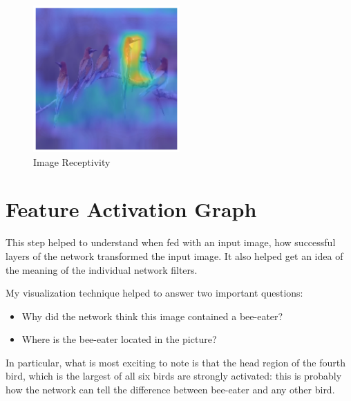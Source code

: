 \begin{figure}[htbp]
\centering
\includegraphics[width=0.50\textwidth]{images/heatmap-class-activations.png}
\caption{Image Receptivity}
\label{fig:heatmap-1}
\end{figure}

\section*{Feature Activation Graph}

This step helped to understand when fed with an input image, how successful layers of the network transformed the input image. It also helped get an idea of the meaning of the individual network filters.

My visualization technique helped to answer two important questions:

\begin{itemize}
\item  Why did the network think this image contained a bee-eater?
\item Where is the bee-eater located in the picture?
\end{itemize}

In particular, what is most exciting to note is that the head region of the fourth bird, which is the largest of all six birds are strongly activated: this is probably how the network can tell the difference between bee-eater and any other bird.

